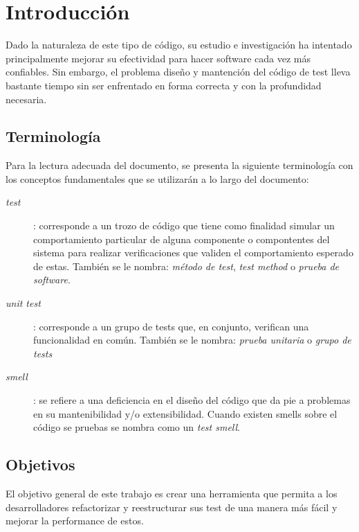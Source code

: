 \chapter{Introducción} 
\par 
Dado la naturaleza de este tipo de código, su estudio e investigación ha intentado principalmente mejorar su efectividad para hacer software cada vez más confiables. Sin embargo, el problema diseño y mantención del código de test lleva bastante tiempo sin ser enfrentado en forma correcta y con la profundidad necesaria. 


\section{Terminología}

\par Para la lectura adecuada del documento, se presenta la siguiente terminología con los conceptos fundamentales que se utilizarán a lo largo del documento:

\begin{description}
\item[\emph{test}]: corresponde a un trozo de código que tiene como finalidad simular un comportamiento particular de alguna componente o compontentes del sistema para realizar verificaciones que validen el comportamiento esperado de estas. También se le nombra: \emph{método de test}, \emph{test method} o \emph{prueba de software}.
\item[\emph{unit test}]: corresponde a un grupo de tests que, en conjunto, verifican una funcionalidad en común. También se le nombra: \emph{prueba unitaria} o \emph{grupo de tests}
\item[\emph{smell}]: se refiere a una deficiencia en el diseño del código que da pie a problemas en su mantenibilidad y/o extensibilidad. Cuando existen smells sobre el código se pruebas se nombra como un \emph{test smell}.
\end{description}





\section{Objetivos}
\par El objetivo general de este trabajo es crear una herramienta que permita a los desarrolladores refactorizar y reestructurar sus test de una manera más fácil y mejorar la performance de estos.

